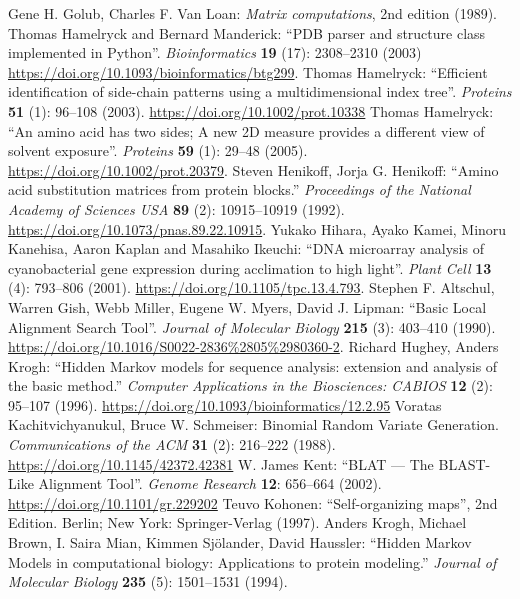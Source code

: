 \documentclass{report}
\begin{document}
\begin{thebibliography}{99}
Gene H. Golub, Charles F. Van Loan: \textit{Matrix computations}, 2nd edition (1989).
Thomas Hamelryck and  Bernard Manderick: ``PDB parser and structure class
implemented in Python''. \textit{Bioinformatics} \textbf{19} (17): 2308--2310 (2003) \url{https://doi.org/10.1093/bioinformatics/btg299}.
Thomas Hamelryck: ``Efficient identification of side-chain patterns using a multidimensional index tree''. \textit{Proteins} {\bf 51} (1): 96--108 (2003).
\url{https://doi.org/10.1002/prot.10338}
Thomas Hamelryck: ``An amino acid has two sides; A new 2D measure provides a different view of solvent exposure''. \textit{Proteins} {\bf 59} (1): 29--48 (2005).
\url{https://doi.org/10.1002/prot.20379}.
Steven Henikoff, Jorja G. Henikoff: ``Amino acid substitution matrices from protein blocks.'' \textit{Proceedings of the National Academy of Sciences USA} {\bf 89} (2): 10915--10919 (1992). \url{https://doi.org/10.1073/pnas.89.22.10915}.
Yukako Hihara, Ayako Kamei, Minoru Kanehisa, Aaron Kaplan and Masahiko Ikeuchi: ``DNA microarray analysis of cyanobacterial gene expression during acclimation to high light''. \textit{Plant Cell} {\bf 13} (4): 793--806 (2001). \url{https://doi.org/10.1105/tpc.13.4.793}.
Stephen F. Altschul, Warren Gish, Webb Miller, Eugene W. Myers, David J. Lipman: ``Basic Local Alignment Search Tool''.  \textit{Journal of Molecular Biology} {\bf 215} (3): 403--410 (1990). \url{https://doi.org/10.1016/S0022-2836%2805%2980360-2}.
Richard Hughey, Anders Krogh: ``Hidden Markov models for sequence analysis: extension and analysis of the basic method.''  \textit{Computer Applications in the Biosciences: CABIOS} {\bf 12} (2): 95--107 (1996).
\url{https://doi.org/10.1093/bioinformatics/12.2.95}
Voratas Kachitvichyanukul, Bruce W. Schmeiser: Binomial Random Variate Generation. \textit{Communications of the ACM} {\bf 31} (2): 216--222 (1988). \url{https://doi.org/10.1145/42372.42381}
W. James Kent: ``BLAT --- The BLAST-Like Alignment Tool''. \textit{Genome Research} {\bf 12}: 656--664 (2002). \url{https://doi.org/10.1101/gr.229202}
Teuvo Kohonen: ``Self-organizing maps'', 2nd Edition. Berlin; New York: Springer-Verlag (1997).
Anders Krogh, Michael Brown, I. Saira Mian, Kimmen Sj\"olander, David Haussler:
``Hidden Markov Models in computational biology: Applications to protein modeling.'' \textit{Journal of Molecular Biology} {\bf 235} (5): 1501--1531 (1994).

\end{thebibliography}
\end{document}
